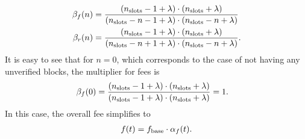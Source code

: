 \documentclass[9pt,oneside]{amsart}
\begin{document}
\begin{multicols}{2}

\begin{align}
\beta_f(n) &= \frac{(n_\textnormal{slots}- 1 + \lambda ) \cdot (n_\textnormal{slots} + \lambda)}{(n_\textnormal{slots}-n-1 + \lambda)\cdot (n_\textnormal{slots}-n + \lambda)}\\
\beta_r(n) &= \frac{(n_\textnormal{slots}- 1 + \lambda ) \cdot (n_\textnormal{slots} + \lambda)}{(n_\textnormal{slots}-n + 1 + \lambda)\cdot (n_\textnormal{slots}-n + \lambda)}.
\end{align}
It is easy to see that for $n=0$, which corresponds to the case of not having any unverified blocks, the multiplier for fees is
\begin{align}
\beta_f(0) &= \frac{(n_\textnormal{slots}- 1 + \lambda ) \cdot (n_\textnormal{slots} + \lambda)
}{(n_\textnormal{slots}-1 + \lambda)\cdot (n_\textnormal{slots} + \lambda)}=1.
\end{align}
In this case, the overall fee simplifies to
\begin{align}
f(t) = f_\textnormal{base} \cdot \alpha_f(t).
\end{align}


\end{multicols}
\end{document}
